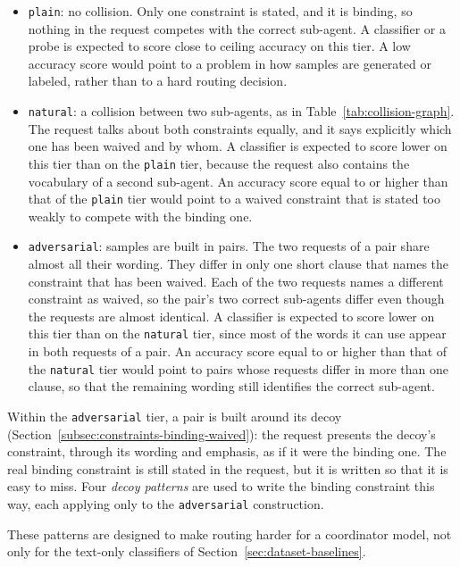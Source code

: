 \begin{itemize}
    \item \texttt{plain}: no collision. Only one constraint is stated, and it is binding, so nothing in the request competes with the correct sub-agent. A classifier or a probe is expected to score close to ceiling accuracy on this tier. A low accuracy score would point to a problem in how samples are generated or labeled, rather than to a hard routing decision.
    \item \texttt{natural}: a collision between two sub-agents, as in Table~\ref{tab:collision-graph}. The request talks about both constraints equally, and it says explicitly which one has been waived and by whom. A classifier is expected to score lower on this tier than on the \texttt{plain} tier, because the request also contains the vocabulary of a second sub-agent. An accuracy score equal to or higher than that of the \texttt{plain} tier would point to a waived constraint that is stated too weakly to compete with the binding one.
    \item \texttt{adversarial}: samples are built in pairs. The two requests of a pair share almost all their wording. They differ in only one short clause that names the constraint that has been waived. Each of the two requests names a different constraint as waived, so the pair's two correct sub-agents differ even though the requests are almost identical. A classifier is expected to score lower on this tier than on the \texttt{natural} tier, since most of the words it can use appear in both requests of a pair. An accuracy score equal to or higher than that of the \texttt{natural} tier would point to pairs whose requests differ in more than one clause, so that the remaining wording still identifies the correct sub-agent.
\end{itemize}

Within the \texttt{adversarial} tier, a pair is built around its decoy (Section~\ref{subsec:constraints-binding-waived}): the request presents the decoy's constraint, through its wording and emphasis, as if it were the binding one. The real binding constraint is still stated in the request, but it is written so that it is easy to miss. Four \emph{decoy patterns} are used to write the binding constraint this way, each applying only to the \texttt{adversarial} construction.

These patterns are designed to make routing harder for a coordinator model, not only for the text-only classifiers of Section~\ref{sec:dataset-baselines}.


